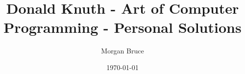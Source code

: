 \documentclass[a4paper,12pt]{book}
\begin{document}
\author{Morgan Bruce}
\title{Donald Knuth - Art of Computer Programming - Personal Solutions}
\date{\today}

\frontmatter
\maketitle
\tableofcontents

\mainmatter


\backmatter
\end{document}

